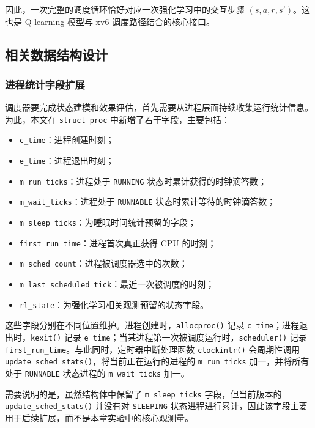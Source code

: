 因此，一次完整的调度循环恰好对应一次强化学习中的交互步骤 $(s,a,r,s')$。这也是 Q-learning 模型与 xv6 调度路径结合的核心接口。

\subsection{相关数据结构设计}

\subsubsection{进程统计字段扩展}

调度器要完成状态建模和效果评估，首先需要从进程层面持续收集运行统计信息。为此，本文在 \texttt{struct proc} 中新增了若干字段，主要包括：

\begin{itemize}
\item \texttt{c\_time}：进程创建时刻；
\item \texttt{e\_time}：进程退出时刻；
\item \texttt{m\_run\_ticks}：进程处于 \texttt{RUNNING} 状态时累计获得的时钟滴答数；
\item \texttt{m\_wait\_ticks}：进程处于 \texttt{RUNNABLE} 状态时累计等待的时钟滴答数；
\item \texttt{m\_sleep\_ticks}：为睡眠时间统计预留的字段；
\item \texttt{first\_run\_time}：进程首次真正获得 CPU 的时刻；
\item \texttt{m\_sched\_count}：进程被调度器选中的次数；
\item \texttt{m\_last\_scheduled\_tick}：最近一次被调度的时刻；
\item \texttt{rl\_state}：为强化学习相关观测预留的状态字段。
\end{itemize}

这些字段分别在不同位置维护。进程创建时，\texttt{allocproc()} 记录 \texttt{c\_time}；进程退出时，\texttt{kexit()} 记录 \texttt{e\_time}；当某进程第一次被调度运行时，\texttt{scheduler()} 记录 \texttt{first\_run\_time}。与此同时，定时器中断处理函数 \texttt{clockintr()} 会周期性调用 \texttt{update\_sched\_stats()}，将当前正在运行的进程的 \texttt{m\_run\_ticks} 加一，并将所有处于 \texttt{RUNNABLE} 状态进程的 \texttt{m\_wait\_ticks} 加一。

需要说明的是，虽然结构体中保留了 \texttt{m\_sleep\_ticks} 字段，但当前版本的 \texttt{update\_sched\_stats()} 并没有对 \texttt{SLEEPING} 状态进程进行累计，因此该字段主要用于后续扩展，而不是本章实验中的核心观测量。

